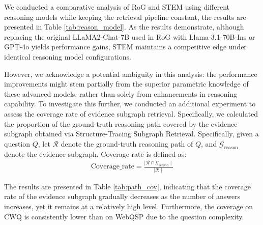\documentclass[11pt]{article}
\begin{document}
We conducted a comparative analysis of RoG and STEM using different reasoning models while keeping the retrieval pipeline constant, the results are presented in Table \ref{tab:reason_model}. As the results demonstrate, although replacing the original LLaMA2-Chat-7B used in RoG with Llama-3.1-70B-Ins or GPT-4o yields performance gains, STEM maintains a competitive edge under identical reasoning model configurations. 

However, we acknowledge a potential ambiguity in this analysis: the performance improvements might stem partially from the superior parametric knowledge of these advanced models, rather than solely from enhancements in reasoning capability. To investigate this further, we conducted an additional experiment to assess the coverage rate of evidence subgraph retrieval. Specifically, we calculated the proportion of the ground-truth reasoning path covered by the evidence subgraph obtained via Structure-Tracing Subgraph Retrieval. Specifically, given a question $Q$, let $\mathcal{R}$ denote the ground-truth reasoning path of $Q$, and $\mathcal{G}_\text{reason}$ denote the evidence subgraph. Coverage rate is defined as:
\begin{align}
\text{Coverage\_rate} = \frac{\mid \mathcal{R} \cap\mathcal{G}_\text{reason}\mid}{\mid \mathcal{R} \mid}
\label{coverage}
\end{align}

The results are presented in Table \ref{tab:path_cov}, indicating that the coverage rate of the evidence subgraph gradually decreases as the number of answers increases, yet it remains at a relatively high level. Furthermore, the coverage on CWQ is consistently lower than on WebQSP due to the question complexity.
\end{document}
